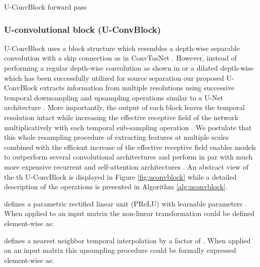 \begin{algorithm}[t!]
\SetAlgoLined
\KwInput{} 
\KwOutput{} 
 \;
 \;
 \;
 \;
 \Return \;
\caption{U-ConvBlock forward pass}
 \label{alg:uconvblock}
\end{algorithm}

\subsubsection{U-convolutional block (U-ConvBlock)}
\label{sec:net_arch:separator:main_block}
U-ConvBlock uses a block structure which resembles a depth-wise separable convolution \cite{sifre2014depthwiseseparable} with a skip connection as in ConvTasNet \cite{luo2019convTasNet}. However, instead of performing a regular depth-wise convolution as shown in \cite{chollet2017xception_depthwiseseparable} or a dilated depth-wise which has been successfully utilized for source separation \cite{luo2019convTasNet,tzinis2019improving,tzinis2019two} our proposed U-ConvBlock extracts information from multiple resolutions using  successive temporal downsampling and  upsampling operations similar to a U-Net architecture \cite{ronneberger2015original_unet}. More importantly, the output of each block leaves the temporal resolution intact while increasing the effective receptive field of the network multiplicatively with each temporal sub-sampling operation \cite{luo2016effectivereceptivefield}. We postulate that this whole resampling procedure of extracting features at multiple scales combined with the efficient increase of the effective receptive field enables \sudo models to outperform several convolutional architectures and perform in par with much more expensive recurrent and self-attention architectures \cite{subakan2020attentionSeparation}. An abstract view of the th U-ConvBlock is displayed in Figure \ref{fig:uconvblock} while a detailed description of the operations is presented in Algorithm \ref{alg:uconvblock}. 
\begin{definition}
 defines a parametric rectified linear unit (PReLU) \cite{he2015PReLU} with  learnable parameters . When applied to an input matrix  the non-linear transformation could be defined element-wise as:

\end{definition}
\begin{definition}
 defines a nearest neighbor temporal interpolation by a factor of . When applied on an input matrix  this upsampling procedure could be formally expressed element-wise as: 
\end{definition}

